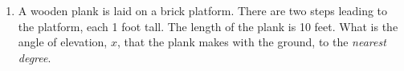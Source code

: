 \documentclass[12pt, twoside]{article}
\begin{document}
\begin{enumerate}
\item A wooden plank is laid on a brick platform. There are two steps leading to the platform, each 1 foot tall. The length of the plank is 10 feet. What is the angle of elevation, $x$, that the plank makes with the ground, to the \emph{nearest degree}.\\[1.cm]
       \vspace{5cm}



  \end{enumerate}
  \newpage
  \setcounter{page}{1}
\end{document}
